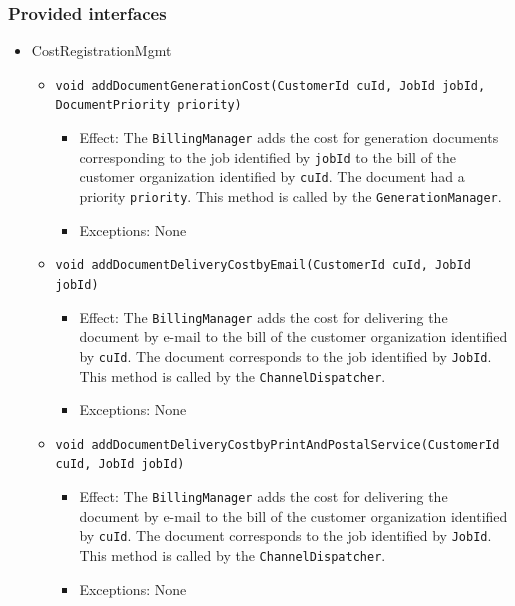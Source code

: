 \documentclass[a4paper,10pt]{article}
\begin{document}
\subsubsection*{Provided interfaces}
\begin{itemize}
    \item CostRegistrationMgmt
    \begin{itemize}
        \item \texttt{void addDocumentGenerationCost(CustomerId cuId, JobId jobId, DocumentPriority priority)}
        \begin{itemize}
            \item Effect: The \texttt{BillingManager} adds the cost for generation documents corresponding to the job identified by \texttt{jobId} to the bill of the customer organization identified by \texttt{cuId}. The document had a priority \texttt{priority}. This method is called by the \texttt{GenerationManager}.
            \item Exceptions: None
        \end{itemize}
        
		\item \texttt{void addDocumentDeliveryCostbyEmail(CustomerId cuId, JobId jobId)}       
        \begin{itemize}
            \item Effect: The \texttt{BillingManager} adds the cost for delivering the document by e-mail to the bill of the customer organization identified by \texttt{cuId}. The document corresponds to the job identified by \texttt{JobId}. This method is called by the \texttt{ChannelDispatcher}.
            \item Exceptions: None
        \end{itemize} 

		\item \texttt{void addDocumentDeliveryCostbyPrintAndPostalService(CustomerId cuId, JobId jobId)}       
        \begin{itemize}
            \item Effect: The \texttt{BillingManager} adds the cost for delivering the document by e-mail to the bill of the customer organization identified by \texttt{cuId}. The document corresponds to the job identified by \texttt{JobId}. This method is called by the \texttt{ChannelDispatcher}.
            \item Exceptions: None
        \end{itemize} 
        

\end{itemize}
\end{itemize}
\end{document}
